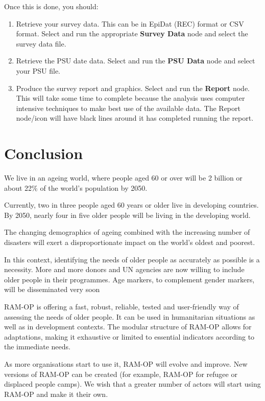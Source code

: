 \documentclass[12pt,a4paper]{book}
\theoremstyle{definition}
\theoremstyle{definition}
\theoremstyle{definition}
\theoremstyle{remark}
\begin{document}
Once this is done, you should:

\begin{enumerate}
\def\labelenumi{\arabic{enumi}.}
\item
  Retrieve your survey data. This can be in EpiDat (REC) format or CSV
  format. Select and run the appropriate \textbf{Survey Data} node and
  select the survey data file.
\item
  Retrieve the PSU date data. Select and run the \textbf{PSU Data} node
  and select your PSU file.
\item
  Produce the survey report and graphics. Select and run the
  \textbf{Report} node. This will take some time to complete because the
  analysis uses computer intensive techniques to make best use of the
  available data. The Report node/icon will have black lines around it
  has completed running the report.
\end{enumerate}

\hypertarget{conclusion}{%
\chapter{Conclusion}\label{conclusion}}

We live in an ageing world, where people aged 60 or over will be 2
billion or about 22\% of the world's population by 2050.

Currently, two in three people aged 60 years or older live in developing
countries. By 2050, nearly four in five older people will be living in
the developing world.

The changing demographics of ageing combined with the increasing number
of disasters will exert a disproportionate impact on the world's oldest
and poorest.

In this context, identifying the needs of older people as accurately as
possible is a necessity. More and more donors and UN agencies are now
willing to include older people in their programmes. Age markers, to
complement gender markers, will be disseminated very soon

RAM-OP is offering a fast, robust, reliable, tested and user-friendly
way of assessing the needs of older people. It can be used in
humanitarian situations as well as in development contexts. The modular
structure of RAM-OP allows for adaptations, making it exhaustive or
limited to essential indicators according to the immediate needs.

As more organisations start to use it, RAM-OP will evolve and improve.
New versions of RAM-OP can be created (for example, RAM-OP for refugee
or displaced people camps). We wish that a greater number of actors will
start using RAM-OP and make it their own.


\end{document}
